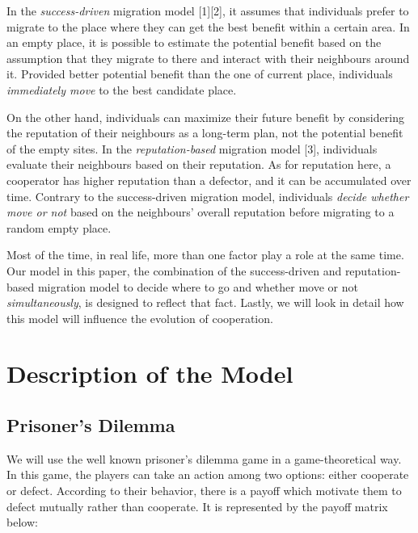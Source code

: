 \documentclass[11pt]{article}
\begin{document}
In the \textit{success-driven} migration model [1][2], it assumes that individuals prefer to migrate to the place where they can get the best benefit within a certain area. In an empty place, it is possible to estimate the potential benefit based on the assumption that they migrate to there and interact with their neighbours around it. Provided better potential benefit than the one of current place, individuals \textit{immediately move} to the best candidate place.  

On the other hand, individuals can maximize their future benefit by considering the reputation of their neighbours as a long-term plan, not the potential benefit of the empty sites. In the \textit{reputation-based} migration model [3], individuals evaluate their neighbours based on their reputation. As for reputation here, a cooperator has higher reputation than a defector, and it can be accumulated over time. Contrary to the success-driven migration model, individuals \textit{decide whether move or not} based on the neighbours' overall reputation before migrating to a random empty place.

Most of the time, in real life, more than one factor play a role at the same time. Our model in this paper, the combination of the success-driven and reputation-based migration model to decide where to go and whether move or not \textit{simultaneously}, is designed to reflect that fact. Lastly, we will look in detail how this model will influence the evolution of cooperation.


\section{Description of the Model}
\subsection{Prisoner's Dilemma}

We will use the well known prisoner's dilemma game in a game-theoretical way. In this game, the players can take an action among two options: either cooperate or defect. According to their behavior, there is a payoff which motivate them to defect mutually rather than cooperate. It is represented by the payoff matrix below:
\end{document}
